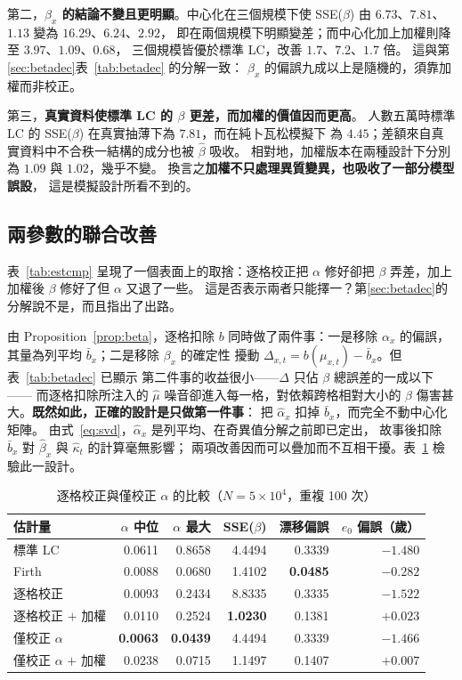 \documentclass[UTF8, fontset=macnew, a4paper, 12pt]{ctexart}
\begin{document}
第二，\textbf{$\beta_x$ 的結論不變且更明顯}。中心化在三個規模下使
SSE($\beta$) 由 $6.73$、$7.81$、$1.13$ 變為 $16.29$、$6.24$、$2.92$，
即在兩個規模下明顯變差；而中心化加上加權則降至 $3.97$、$1.09$、$0.68$，
三個規模皆優於標準 LC，改善 $1.7$、$7.2$、$1.7$ 倍。
這與第\ref{sec:betadec}表~\ref{tab:betadec} 的分解一致：
$\beta_x$ 的偏誤九成以上是隨機的，須靠加權而非校正。

第三，\textbf{真實資料使標準 LC 的 $\beta$ 更差，而加權的價值因而更高}。
人數五萬時標準 LC 的 SSE($\beta$) 在真實抽薄下為 $7.81$，而在純卜瓦松模擬下
為 $4.45$；差額來自真實資料中不合秩一結構的成分也被 $\hat\beta$ 吸收。
相對地，加權版本在兩種設計下分別為 $1.09$ 與 $1.02$，幾乎不變。
換言之\textbf{加權不只處理異質變異，也吸收了一部分模型誤設}，
這是模擬設計所看不到的。

\subsection{兩參數的聯合改善}\label{sec:joint}

表~\ref{tab:estcmp} 呈現了一個表面上的取捨：逐格校正把 $\alpha$ 修好卻把
$\beta$ 弄差，加上加權後 $\beta$ 修好了但 $\alpha$ 又退了一些。
這是否表示兩者只能擇一？第\ref{sec:betadec}的分解說不是，而且指出了出路。

由 Proposition~\ref{prop:beta}，逐格扣除 $b$ 同時做了兩件事：一是移除
$\alpha_x$ 的偏誤，其量為列平均 $\bar b_x$；二是移除 $\beta_x$ 的確定性
擾動 $\Delta_{x,t}=b(\mu_{x,t})-\bar b_x$。但表~\ref{tab:betadec} 已顯示
第二件事的收益很小——$\Delta$ 只佔 $\beta$ 總誤差的一成以下——
而逐格扣除所注入的 $\hat\mu$ 噪音卻進入每一格，對依賴跨格相對大小的
$\beta$ 傷害甚大。\textbf{既然如此，正確的設計是只做第一件事}：
把 $\hat\alpha_x$ 扣掉 $\bar b_x$，而完全不動中心化矩陣。
由式~\eqref{eq:svd}，$\hat\alpha_x$ 是列平均、在奇異值分解之前即已定出，
故事後扣除 $\bar b_x$ 對 $\hat\beta_x$ 與 $\hat\kappa_t$ 的計算毫無影響；
兩項改善因而可以疊加而不互相干擾。表~\ref{tab:joint} 檢驗此一設計。

\begin{table}[H]
\centering
\caption{逐格校正與僅校正 $\alpha$ 的比較（$N=5\times10^4$，重複 100 次）}
\small
\begin{tabular}{lrrrrr}
\toprule
估計量 & $\alpha$ 中位 & $\alpha$ 最大 & SSE($\beta$) & 漂移偏誤 & $e_0$ 偏誤（歲）\\
\midrule
標準 LC              & 0.0611 & 0.8658 & 4.4494 & 0.3339 & $-1.480$\\
Firth                & 0.0088 & 0.0680 & 1.4102 & \textbf{0.0485} & $-0.282$\\
逐格校正             & 0.0093 & 0.2434 & 8.8335 & 0.3335 & $-1.522$\\
逐格校正 $+$ 加權     & 0.0110 & 0.2524 & \textbf{1.0230} & 0.1381 & $+0.023$\\
僅校正 $\alpha$      & \textbf{0.0063} & \textbf{0.0439} & 4.4494 & 0.3339 & $-1.466$\\
僅校正 $\alpha$ $+$ 加權 & 0.0238 & 0.0715 & 1.1497 & 0.1407 & \textbf{$+0.007$}\\
\bottomrule
\end{tabular}
\label{tab:joint}
\end{table}
\end{document}
